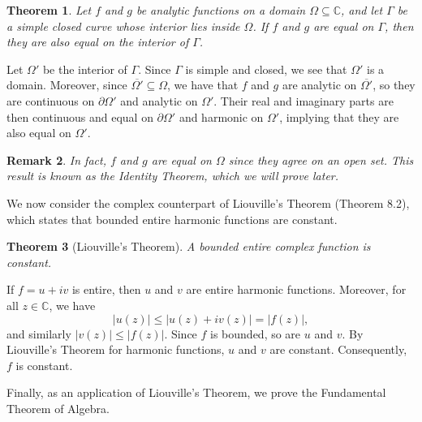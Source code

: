 \documentclass[10pt]{article}
\makeatletter
\newcommand{\C}{\mathbb{C}}
\theoremstyle{newstyle}
\newtheorem{thm}{Theorem}[section]
\newtheorem{remark}[thm]{Remark}
\newenvironment{pf}[1][\proofname]{\par
  \pushQED{\qed}%
  \normalfont \topsep0\p@\relax
  \trivlist
  \item[\hskip\labelsep\scshape
  #1\@addpunct{.}]\ignorespaces
}{%
  \popQED\endtrivlist\@endpefalse
}
\makeatother
\begin{document}
\begin{thm}
Let $f$ and $g$ be analytic functions on a domain $\Omega \subseteq \C$, and let 
$\Gamma$ be a simple closed curve whose interior lies inside $\Omega$. If $f$ and $g$ 
are equal on $\Gamma$, then they are also equal on the interior of $\Gamma$.
\end{thm}
\begin{pf}
Let $\Omega'$ be the interior of $\Gamma$. Since $\Gamma$ is simple and closed, we see that 
$\Omega'$ is a domain. Moreover, since $\overline{\Omega'} \subseteq \Omega$, we have that 
$f$ and $g$ are analytic on $\overline{\Omega'}$, so they are continuous on 
$\partial\Omega'$ and analytic on $\Omega'$. Their real and imaginary parts are then continuous 
and equal on $\partial\Omega'$ and harmonic on $\Omega'$, implying that they are also equal on 
$\Omega'$. 
\end{pf}

\begin{remark}
In fact, $f$ and $g$ are equal on $\Omega$ since they agree on an open set. This result 
is known as the Identity Theorem, which we will prove later. 
\end{remark}

We now consider the complex counterpart of Liouville's Theorem (Theorem 8.2), which states that 
bounded entire harmonic functions are constant. 

\begin{thm}[Liouville's Theorem]
A bounded entire complex function is constant.
\end{thm}
\begin{pf}
If $f = u+iv$ is entire, then $u$ and $v$ are entire harmonic functions. Moreover, for all $z \in 
\C$, we have 
\[ |u(z)| \leq |u(z) + iv(z)| = |f(z)|, \]
and similarly $|v(z)| \leq |f(z)|$. Since $f$ is bounded, so are $u$ and $v$. By Liouville's 
Theorem for harmonic functions, $u$ and $v$ are constant. Consequently, $f$ is constant. 
\end{pf}

Finally, as an application of Liouville's Theorem, we prove the Fundamental Theorem of Algebra. 
\end{document}
